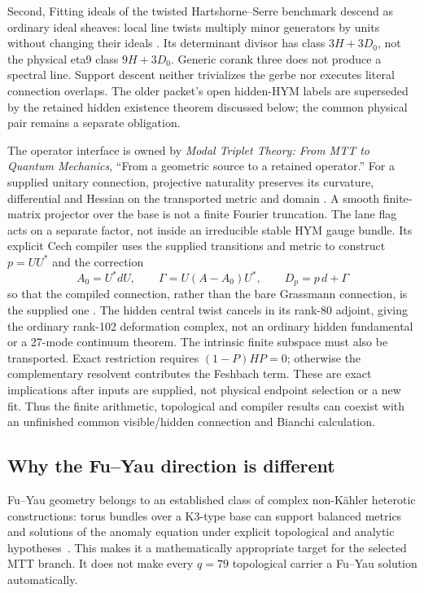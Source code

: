 \documentclass[11pt]{article}
\theoremstyle{definition}
\theoremstyle{remark}
\begin{document}
Second, Fitting ideals of the twisted Hartshorne--Serre benchmark descend
as ordinary ideal sheaves: local line twists multiply minor generators by
units without changing their ideals \cite{FluxFitting}. Its determinant
divisor has class \(3H+3D_0\), not the physical eta9 class \(9H+3D_0\).
Generic corank three does not produce a spectral line. Support descent
neither trivializes the gerbe nor executes literal connection overlaps.
The older packet's open hidden-HYM labels are superseded by the retained
hidden existence theorem discussed below; the common physical pair remains
a separate obligation.

The operator interface is owned by \emph{Modal Triplet Theory: From MTT to
Quantum Mechanics}, ``From a geometric source to a retained operator.''
For a supplied unitary connection, projective naturality preserves its
curvature, differential and Hessian on the transported metric and domain
\cite{FluxNaturality}. A smooth finite-matrix projector over the base is
not a finite Fourier truncation. The lane flag acts on a separate factor,
not inside an irreducible stable HYM gauge bundle. Its explicit Cech
compiler uses the supplied transitions and metric to construct \(p=UU^*\)
and the correction
\[
 A_0=U^*dU,\qquad \Gamma=U(A-A_0)U^*,\qquad D_p=p\,d+\Gamma
\]
so that the compiled connection, rather than the bare Grassmann connection,
is the supplied one \cite{FluxCechCompiler}. The hidden central twist
cancels in its rank-80 adjoint, giving the ordinary rank-102 deformation
complex, not an ordinary hidden fundamental or a 27-mode continuum theorem.
The intrinsic finite subspace must also be transported. Exact restriction
requires \((1-P)HP=0\); otherwise the complementary resolvent contributes
the Feshbach term. These are exact implications after inputs are supplied,
not physical endpoint selection or a new fit. Thus the finite arithmetic,
topological and compiler results can coexist with an unfinished common
visible/hidden connection and Bianchi calculation.

\subsection{Why the Fu--Yau direction is different}

Fu--Yau geometry belongs to an established class of complex non-K\"ahler
heterotic constructions: torus bundles over a K3-type base can support
balanced metrics and solutions of the anomaly equation under explicit
topological and analytic hypotheses~\cite{FuYau2008,FinoGrantcharovVezzoni2021}.
This makes it a mathematically appropriate target for the selected MTT branch.
It does not make every \(q=79\) topological carrier a Fu--Yau solution
automatically.
\end{document}
